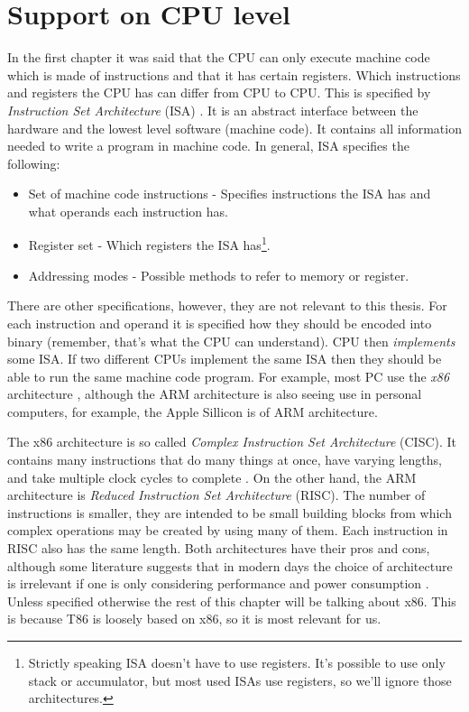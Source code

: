 \section{Support on CPU level} In the first chapter it was said that the CPU
can only execute machine code which is made of instructions and that it has
certain registers. Which instructions and registers the CPU has can differ from
CPU to CPU. This is specified by \textit{Instruction Set Architecture} (ISA)
\cite{aps-isa}. It is an abstract interface between the hardware and the lowest
level software (machine code). It contains all information needed to write a
program in machine code. In general, ISA specifies the following: 
\begin{itemize}
    \item Set of machine code instructions - Specifies instructions the ISA has
        and what operands each instruction has.
    \item Register set - Which registers the ISA has\footnote{Strictly speaking
        ISA doesn't have to use registers. It's possible to use only stack or
        accumulator, but most used ISAs use registers, so we'll ignore those
        architectures. }.   
    \item Addressing modes - Possible methods to refer to memory or register. 
\end{itemize} There are other specifications,
however, they are not relevant to this thesis. For each instruction and operand
it is specified how they should be encoded into binary (remember, that's what
the CPU can understand). CPU then \textit{implements} some ISA. If two
different CPUs implement the same ISA then they should be able to run the same
machine code program. For example, most PC use the \textit{x86} architecture
\cite{aps-isa}, although the ARM architecture is also seeing use in personal
computers, for example, the Apple Sillicon is of ARM architecture.

The x86 architecture is so called \textit{Complex Instruction Set Architecture}
(CISC). It contains many instructions that do many things at once, have varying
lengths, and take multiple clock cycles to complete \cite{intel-manual}. On the
other hand, the ARM architecture is \textit{Reduced Instruction Set
Architecture} (RISC). The number of instructions is smaller, they are intended
to be small building blocks from which complex operations may be created by
using many of them. Each instruction in RISC also has the same length. Both
architectures have their pros and cons, although some literature suggests that
in modern days the choice of architecture is irrelevant if one is only
considering performance and power consumption \cite{riscvscisc1, riscvscisc2}.
Unless specified otherwise the rest of this chapter will be talking about x86.
This is because T86  is loosely based on x86, so it is most relevant
for us.

